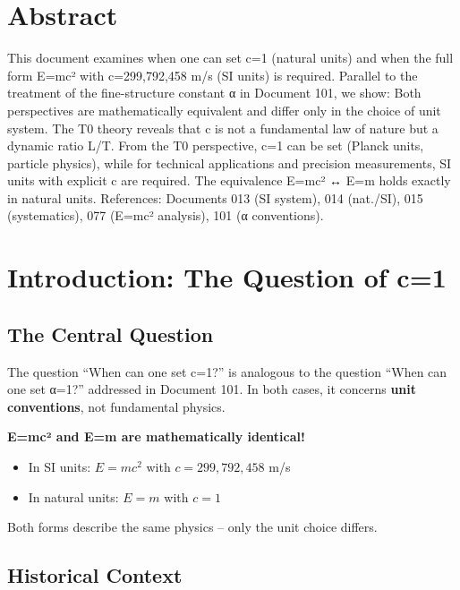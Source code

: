 \section*{Abstract}
		This document examines when one can set c=1 (natural units) and when the full form E=mc² with c=299,792,458 m/s (SI units) is required. Parallel to the treatment of the fine-structure constant α in Document 101, we show: Both perspectives are mathematically equivalent and differ only in the choice of unit system. The T0 theory reveals that c is not a fundamental law of nature but a dynamic ratio L/T. From the T0 perspective, c=1 can be set (Planck units, particle physics), while for technical applications and precision measurements, SI units with explicit c are required. The equivalence E=mc² ↔ E=m holds exactly in natural units. References: Documents 013 (SI system), 014 (nat./SI), 015 (systematics), 077 (E=mc² analysis), 101 (α conventions).

	
	
	
	\section{Introduction: The Question of c=1}
	
	\subsection{The Central Question}
	
	The question ``When can one set c=1?'' is analogous to the question ``When can one set α=1?'' addressed in Document 101. In both cases, it concerns \textbf{unit conventions}, not fundamental physics.
	
	\begin{tcolorbox}[colback=blue!5!white,colframe=blue!75!black,title=Central Thesis]
		\textbf{E=mc² and E=m are mathematically identical!}
		
		\begin{itemize}
			\item In SI units: $E = mc^2$ with $c = 299,792,458$ m/s
			\item In natural units: $E = m$ with $c = 1$
		\end{itemize}
		
		Both forms describe the same physics -- only the unit choice differs.
	\end{tcolorbox}
	
	\subsection{Historical Context}
	
